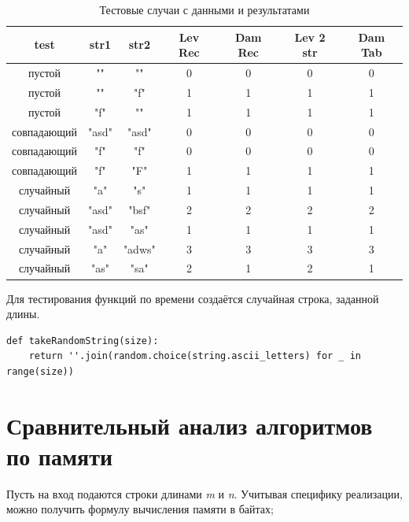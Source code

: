 \documentclass[12pt]{report}
\begin{document}
\begin{table}[h!]
	\begin{tabular}{|c|c|c|c|c|c|c|} 
 	\hline
	test & str1 & str2 & Lev Rec & Dam Rec & Lev 2 str & Dam Tab \\ [0.5ex] 
 	\hline\hline
 	пустой & "" & "" & 0 & 0 & 0 & 0\\
 	\hline
 	пустой & "" & "f" & 1 & 1 & 1 & 1\\
 	\hline
	пустой & "f" & "" & 1 & 1 & 1 & 1\\
	\hline
	совпадающий & "asd" & "asd" & 0 & 0 & 0 & 0\\
 	\hline
 	совпадающий & "f" & "f" & 0 & 0 & 0 & 0\\
 	\hline
	совпадающий & "f" & "F" & 1 & 1 & 1 & 1\\
	\hline
	случайный & "a" & "s" & 1 & 1 & 1 & 1\\
 	\hline
 	случайный & "asd" & "bsf" & 2 & 2 & 2 & 2\\
 	\hline
	случайный & "asd" & "as" & 1 & 1 & 1 & 1\\
	\hline
 	случайный & "a" & "adws" & 3 & 3 & 3 & 3\\
 	\hline
 	случайный & "as" & "sa" & 2 & 1 & 2 & 1\\
 	\hline
	\hline
	\end{tabular}
\caption{Тестовые случаи с данными и результатами}
\end{table}

Для тестирования функций по времени создаётся случайная строка, заданной длины.

\begin{lstlisting}[label=takeRandomString,caption=Функция генерации случайной строки]
def takeRandomString(size):
    return ''.join(random.choice(string.ascii_letters) for _ in range(size))
\end{lstlisting}

\section{Сравнительный анализ алгоритмов по памяти}
Пусть на вход подаются строки длинами \textit{m} и \textit{n}. Учитывая специфику реализации, можно получить формулу вычисления памяти в байтах;
\newline
\end{document}
